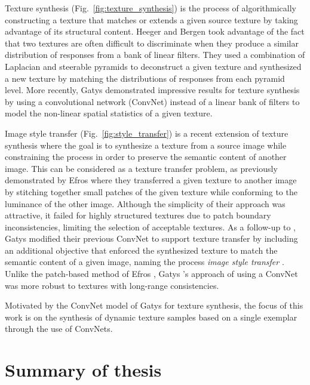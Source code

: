 

Texture synthesis (Fig.\ \ref{fig:texture_synthesis}) is the process of algorithmically constructing a texture that
matches or extends a given source texture by taking advantage of its structural 
content. Heeger and Bergen \cite{heeger1995pyramid} took advantage of the fact 
that two textures are often difficult to discriminate when they produce a similar 
distribution of responses from a bank of linear filters. They used a combination 
of Laplacian and steerable pyramids to deconstruct a given texture and 
synthesized a new texture by matching the distributions of responses from each
pyramid level. More recently, Gatys \etal \cite{gatys2015} demonstrated 
impressive results for texture synthesis by using a convolutional network (ConvNet) instead of a linear 
bank of filters to model the non-linear spatial statistics of a given texture.



Image style transfer (Fig.\ \ref{fig:style_transfer}) is a recent extension of texture synthesis where the goal is to 
synthesize a texture from a source image while constraining the process in order 
to preserve the semantic content of another image. This can be considered as a 
texture transfer problem, as previously demonstrated by Efros \etal \cite{efros2001image} where they transferred a given texture to another image by stitching together small patches of the given texture while conforming to the luminance of the other image. Although the simplicity of their approach was attractive, it failed for highly structured textures due to patch boundary inconsistencies, limiting the selection of acceptable textures. 
As a follow-up to \cite{gatys2015}, Gatys \etal modified their previous ConvNet to support texture transfer by including an additional objective that enforced the synthesized texture to match the semantic content of a given image, naming the process \emph{image style transfer} \cite{gatys2016image}. Unlike the patch-based method of Efros \etal \cite{efros2001image}, Gatys \etal's \cite{gatys2016image} approach of using a ConvNet was more robust to textures with long-range consistencies.

Motivated by the ConvNet model of Gatys \etal \cite{gatys2016image} for texture synthesis, the focus of this work is on the synthesis of dynamic texture 
samples based on a single exemplar through the use of ConvNets.

\section{Summary of thesis}

